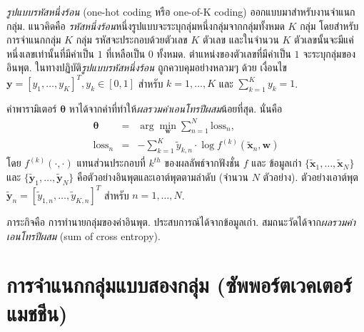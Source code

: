 \textit{รูปแบบรหัสหนึ่งร้อน} (one-hot coding หรือ one-of-K coding)%
ออกแบบมาสำหรับงานจำแนกกลุ่ม.
แนวคิดคือ \textit{รหัสหนึ่งร้อน}หนึ่งรูปแบบจะระบุกลุ่มหนึ่งกลุ่มจากกลุ่มทั้งหมด $K$ กลุ่ม 
โดยสำหรับการจำแนกกลุ่ม $K$ กลุ่ม รหัสจะประกอบด้วยตัวเลข $K$ ตัวเลข
และในจำนวน $K$ ตัวเลขนั้นจะมีแค่หนึ่งเลขเท่านั้นที่มีค่าเป็น $1$ ที่เหลือเป็น $0$ ทั้งหมด.
ตำแหน่งของตัวเลขที่มีค่าเป็น $1$ จะระบุกลุ่มของอินพุต.
ในทางปฏิบัติ\textit{รูปแบบรหัสหนึ่งร้อน} ถูกควบคุมอย่างหลวมๆ ด้วย
เงื่อนไข $\bm{y} = [y_1, \ldots, y_K]^T, y_k \in [0,1]$ สำหรับ $k = 1, \ldots, K$ และ $\sum_{k=1}^K y_k = 1$.

ค่าพารามิเตอร์ $\bm{\theta}$ หาได้จากค่าที่ทำให้\textit{ผลรวมค่าเอนโทรปีผสม}น้อยที่สุด.
นั่นคือ
\begin{eqnarray}
  \bm{\theta} &=& \arg\min_{\bm{w}} \sum_{n=1}^N \mathrm{loss}_n
  \label{eq: opt classification loss}, \\
%
  \mathrm{loss}_n &=& - \sum_{k=1}^K \tilde{y}_{k,n} \cdot \log f^{(k)}(\bm{\tilde{x}}_n, \bm{w})
  \label{eq: opt classification cross-entropy}
\end{eqnarray}
โดย
$f^{(k)}(\cdot, \cdot)$ แทนส่วนประกอบที่ $k^{th}$ ของผลลัพธ์จากฟังชั่น $f$
และ
ข้อมูลเก่า $\{\bm{\tilde{x}}_1, \ldots, \bm{\tilde{x}}_N\}$ และ $\{\bm{\tilde{y}}_1, \ldots, \bm{\tilde{y}}_N\}$ คือตัวอย่างอินพุตและเอาต์พุตตามลำดับ (จำนวน $N$ ตัวอย่าง).
ตัวอย่างเอาต์พุต $\bm{\tilde{y}}_n = [\tilde{y}_{1,n}, \ldots, \tilde{y}_{K,n}]^T$ สำหรับ $n=1, \ldots, N$.

ภาระกิจคือ การทำนายกลุ่มของค่าอินพุต.
ประสบการณ์ได้จากข้อมูลเก่า.
สมถนะวัดได้จาก\textit{ผลรวมค่าเอนโทรปีผสม} (sum of cross entropy).

\section{การจำแนกกลุ่มแบบสองกลุ่ม (ซัพพอร์ตเวคเตอร์แมชชีน)}

